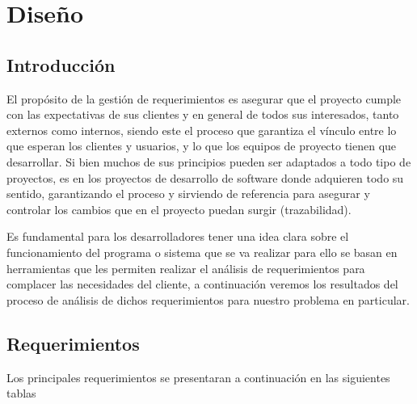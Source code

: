 \chapter{Diseño}


\section{Introducción}

El propósito de la gestión de requerimientos es asegurar que el proyecto cumple con las expectativas de sus clientes y en general de todos sus interesados, tanto externos como internos, siendo este el proceso que garantiza el vínculo entre lo que esperan los clientes y usuarios, y lo que los equipos de proyecto tienen que desarrollar. Si bien muchos de sus principios pueden ser adaptados a todo tipo de proyectos, es en los proyectos de desarrollo de software donde adquieren todo su sentido, garantizando el proceso y sirviendo de referencia para asegurar y controlar los cambios que en el proyecto puedan surgir (trazabilidad).

Es fundamental para los desarrolladores tener una idea clara sobre el funcionamiento del programa o sistema que se va realizar para ello se basan en herramientas que les permiten realizar el análisis de requerimientos para complacer las necesidades del cliente, a continuación veremos los resultados del proceso de análisis de dichos requerimientos para nuestro problema en particular.

\newpage

\section{Requerimientos}
Los principales requerimientos se presentaran a continuación en las siguientes tablas

